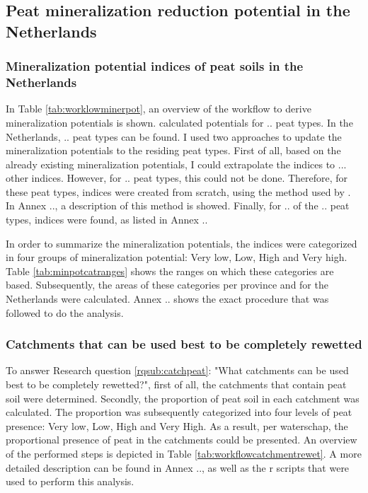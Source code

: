 \documentclass[a4paper,12pt]{scrbook}
\begin{document}
\subsection{Peat mineralization reduction potential in the Netherlands}

\subsubsection{Mineralization potential indices of peat soils in the Netherlands}

In Table \ref{tab:worklowminerpot}, an overview of the workflow to derive mineralization potentials is shown. \citet{stouthamer2008toelichting} calculated potentials for .. peat types. In the Netherlands, .. peat types can be found. I used two approaches to update the mineralization potentials to the residing peat types. First of all, based on the already existing mineralization potentials, I could extrapolate the indices to ... other indices. However, for .. peat types, this could not be done. Therefore, for these peat types, indices were created from scratch, using the method used by \citet{stouthamer2008toelichting}. In Annex .., a description of this method is showed. Finally, for .. of the .. peat types, indices were found, as listed in Annex .. 

In order to summarize the mineralization potentials, the indices were categorized in four groups of mineralization potential: Very low, Low, High and Very high. Table \ref{tab:minpotcatranges} shows the ranges on which these categories are based. Subsequently, the areas of these categories per province and for the Netherlands were calculated. Annex .. shows the exact procedure that was followed to do the analysis.

\subsubsection{Catchments that can be used best to be completely rewetted}

To answer Research question \ref{rqsub:catchpeat}: "What catchments can be used best to be completely rewetted?", first of all, the catchments that contain peat soil were determined. Secondly, the proportion of peat soil in each catchment was calculated. The proportion was subsequently categorized into four levels of peat presence: Very low, Low, High and Very High. As a result, per waterschap, the proportional presence of peat in the catchments could be presented. An overview of the performed steps is depicted in Table \ref{tab:workflowcatchmentrewet}. A more detailed description can be found in Annex .., as well as the r scripts that were used to perform this analysis.
\end{document}
